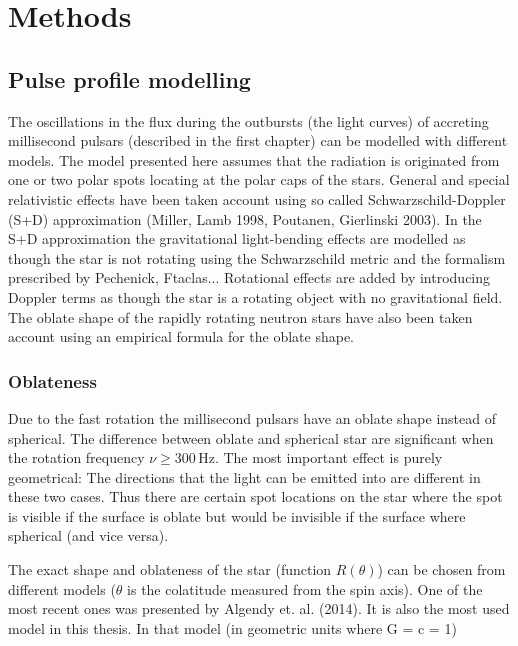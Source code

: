 \documentclass{wihuri}
\begin{document}
\fi

\section{Methods}

\subsection{Pulse profile modelling}

The oscillations in the flux during the outbursts (the light curves) of accreting millisecond pulsars (described in the first chapter) can be modelled with different models. The model presented here assumes that the radiation is originated from one or two polar spots locating at the polar caps of the stars. General and special relativistic effects have been taken account using so called Schwarzschild-Doppler (S+D) approximation (Miller, Lamb 1998, Poutanen, Gierlinski 2003). In the S+D approximation the gravitational light-bending effects are modelled as though the star is not rotating using the Schwarzschild metric and the formalism prescribed by
Pechenick, Ftaclas... %
Rotational effects are added by introducing Doppler terms as though the star is a rotating object with no gravitational field. The oblate shape of the rapidly rotating neutron stars have also been taken account using an empirical formula for the oblate shape.




\subsubsection{Oblateness}

Due to the fast rotation the millisecond pulsars have an oblate shape instead of spherical. The difference between oblate and spherical star are significant when the rotation frequency $\nu \ge 300 \, \mathrm{Hz}$. The most important effect is purely geometrical: The directions that the light can be emitted into are different in these two cases. Thus there are certain spot locations on the star where the spot is visible if the surface is oblate but would be invisible if the surface where spherical (and vice versa).


The exact shape and oblateness of the star (function $R(\theta)$) can be chosen from different models ($\theta$ is the colatitude measured from the spin axis). One of the most recent ones was presented by Algendy et. al. (2014).%
It is also the most used model in this thesis. In that model (in geometric units
where G = c = 1)
\end{document}
